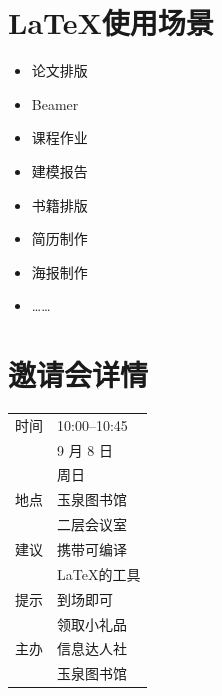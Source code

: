 \documentclass[a0paper,fleqn]{betterposter}
\begin{document}
{\section{\LaTeX 使用场景}
\begin{multicols}{2}
\begin{itemize}
\item %
论文排版%
\item Beamer %
\item 课程作业
\item 建模报告
\item 书籍排版
\item 简历制作
\item 海报制作
\item ……
\end{itemize}
\end{multicols}

\section{邀请会详情}

\begin{tabular}{l@{\quad}p{}}
时间 & 10:00--10:45\\ & 9 月 8 日 \\ & 周日 \\[1ex]
地点 & 玉泉图书馆\\ & 二层会议室 \\[1ex]
建议 & 携带可编译\\ & \LaTeX 的工具 \\[1ex]
提示 & 到场即可\\ & 领取小礼品 \\[5ex] 

主办 & 信息达人社\\
& 玉泉图书馆
\end{tabular}
}
\end{document}
